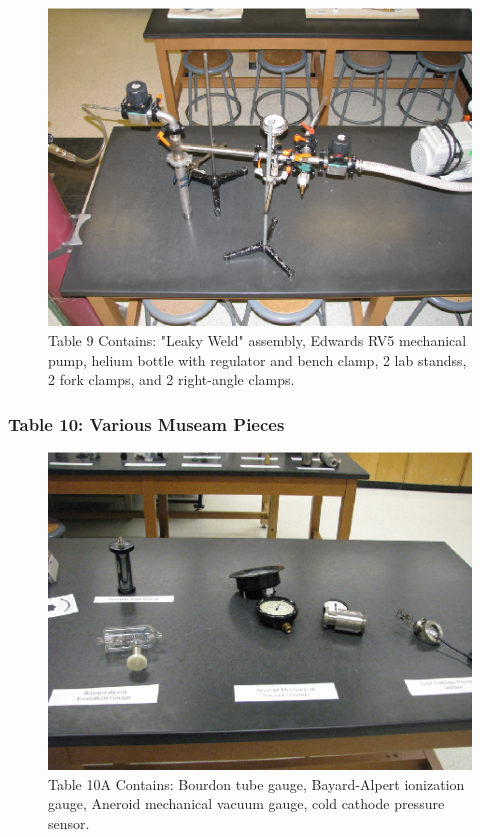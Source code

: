 \documentclass{book}
\begin{document}
\begin{figure}[H]
\includegraphics[scale=0.9]{Leaks-and-Leak-Testing-Table9}
\caption[align=left]{Table 9 Contains: "Leaky Weld" assembly, Edwards RV5 mechanical pump, helium bottle with regulator and bench clamp, 2 lab standss, 2 fork clamps, and 2 right-angle clamps.}
\end{figure}

\subsubsection{Table 10: Various Museam Pieces}

\begin{figure}[H]
\includegraphics[scale=0.9]{Museum-Pieces-Table10A}
\caption[align=left]{Table 10A Contains: Bourdon tube gauge, Bayard-Alpert ionization gauge, Aneroid mechanical vacuum gauge, cold cathode pressure sensor.}
\end{figure}
\end{document}

